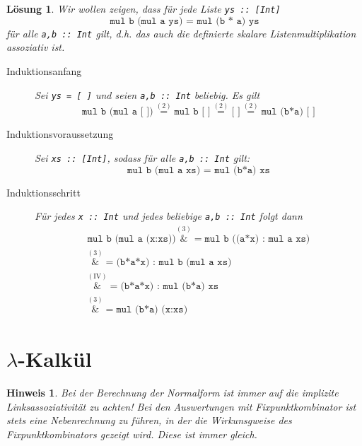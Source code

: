 \documentclass[ngerman,a4paper, 11pt]{scrartcl}
\theoremstyle{break}
\theoremstyle{nonumberplain}
\newtheorem{solution}{Lösung}
\newtheorem{hint}{Hinweis}
\begin{document}
\begin{solution}
	Wir wollen zeigen, dass für jede Liste \texttt{ys :: [Int]}
	\begin{equation*}
	\texttt{mul b (mul a ys) = mul (b * a) ys}
	\end{equation*}
	für alle \texttt{a,b :: Int} gilt, d.h. das auch die definierte skalare Listenmultiplikation assoziativ ist.
	
	\begin{description}
		\item[Induktionsanfang] Sei \texttt{ys = [ ]} und seien \texttt{a,b :: Int} beliebig. Es gilt
		\begin{equation*}
		\texttt{mul b (mul a [ ])} \overset{(2)}{=} \texttt{mul b [ ]} \overset{(2)}{=} \texttt{[ ]} \overset{(2)}{=} \texttt{mul (b*a) [ ]}
		\end{equation*}
		\item[Induktionsvoraussetzung] Sei \texttt{xs :: [Int]}, sodass für alle \texttt{a,b :: Int} gilt:
		\begin{equation*}
		\texttt{mul b (mul a xs) = mul (b*a) xs}
		\end{equation*}
		\item[Induktionsschritt] Für jedes \texttt{x :: Int} und jedes beliebige \texttt{a,b :: Int} folgt dann
		\begin{align*}
		\texttt{mul b (mul a (x:xs))} \overset{(3)}&{=} \texttt{mul b ((a*x) : mul a xs)} \\
		\overset{(3)}&{=} \texttt{(b*a*x) : mul b (mul a xs)} \\
		\overset{(\text{IV})}&{=} \texttt{(b*a*x) : mul (b*a) xs} \\
		\overset{(3)}&{=} \texttt{mul (b*a) (x:xs)}
		\end{align*}
	\end{description}
\end{solution}

\pagebreak

\section{$\lambda$-Kalkül}

\begin{hint}
	Bei der Berechnung der Normalform ist immer auf die implizite Linksassoziativität zu achten! Bei den Auswertungen mit Fixpunktkombinator ist stets eine  Nebenrechnung zu führen, in der die Wirkunsgweise des Fixpunktkombinators gezeigt wird. Diese ist immer gleich.
\end{hint}
\end{document}
